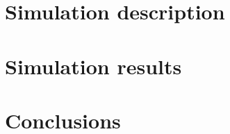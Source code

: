 \documentclass[12pt,reqno,a4paper,oneside,draft]{article}
\theoremstyle{plain}
\theoremstyle{definition}
\theoremstyle{remark}
\begin{document}
\section{Simulation description}
\label{sec:Simulation_description}

\section{Simulation results}
\label{sec:Simulation_results}

\section{Conclusions}
\label{sec:Conclusions}
\end{document}
